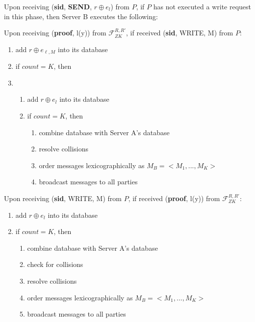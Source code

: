 \begin{tcolorbox}[colback=white, arc=5pt]

\extitem Upon receiving (\textbf{sid}, \textbf{SEND}, $r\oplus e_l$) from $P$, if $P$ has not executed a write request in this phase, then
    Server B executes the following:
    
    
    Upon receiving (\textbf{proof}, l(y)) from $\mathcal{F}_{ZK}^{R,R'}$, if received (\textbf{sid}, WRITE, M) from $P$:
    \begin{enumerate}
        \item add $r\oplus e_{\ell,M}$ into its database  
        \item if $count=K$, then
        \item 
        \begin{enumerate}
            \item add $r\oplus e_l$ into its database  
            \item if $count=K$, then
            \begin{enumerate}
                \item combine database with Server A's database
                \item resolve collisions
                \item order messages lexicographically as $M_B=<M_1,...,M_K>$
                \item broadcast messages to all parties
            \end{enumerate}
        \end{enumerate}
    \end{enumerate}
    Upon receiving (\textbf{sid}, WRITE, M) from $P$, if received (\textbf{proof}, l(y)) from $\mathcal{F}_{ZK}^{R,R'}$:
        \begin{enumerate}
            \item add $r\oplus e_l$ into its database  
            \item if $count=K$, then
            \begin{enumerate}
                \item combine database with Server A's database
                \item check for collisions
                \item resolve collisions
                \item order messages lexicographically as $M_B=<M_1,...,M_K>$
                \item broadcast messages to all parties
            \end{enumerate}
        \end{enumerate}



\end{tcolorbox}
